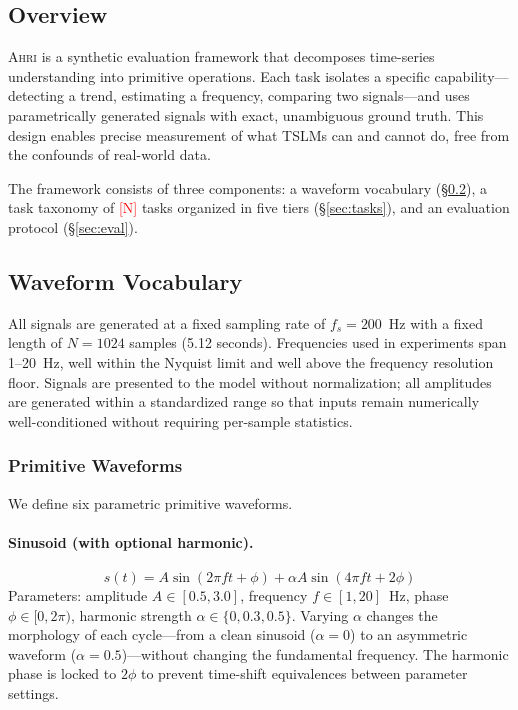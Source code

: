 \documentclass[11pt]{article}
\newcommand{\ahri}{\textsc{Ahri}}
\newcommand{\placeholder}[1]{\textcolor{red}{[#1]}}
\begin{document}
\subsection{Overview}

\ahri{} is a synthetic evaluation framework that decomposes time-series understanding into primitive operations. Each task isolates a specific capability---detecting a trend, estimating a frequency, comparing two signals---and uses parametrically generated signals with exact, unambiguous ground truth. This design enables precise measurement of what TSLMs can and cannot do, free from the confounds of real-world data.

The framework consists of three components: a waveform vocabulary (\S\ref{sec:waveforms}), a task taxonomy of \placeholder{N} tasks organized in five tiers (\S\ref{sec:tasks}), and an evaluation protocol (\S\ref{sec:eval}).

\subsection{Waveform Vocabulary}
\label{sec:waveforms}

All signals are generated at a fixed sampling rate of $f_s = 200$~Hz with a fixed length of $N = 1024$ samples (5.12 seconds). Frequencies used in experiments span 1--20~Hz, well within the Nyquist limit and well above the frequency resolution floor. Signals are presented to the model without normalization; all amplitudes are generated within a standardized range so that inputs remain numerically well-conditioned without requiring per-sample statistics.

\subsubsection{Primitive Waveforms}

We define six parametric primitive waveforms.

\paragraph{Sinusoid (with optional harmonic).}
\begin{equation}
    s(t) = A \sin(2\pi f t + \phi) + \alpha A \sin(4\pi f t + 2\phi)
\end{equation}
Parameters: amplitude $A \in [0.5, 3.0]$, frequency $f \in [1, 20]$~Hz, phase $\phi \in [0, 2\pi)$, harmonic strength $\alpha \in \{0, 0.3, 0.5\}$. Varying $\alpha$ changes the morphology of each cycle---from a clean sinusoid ($\alpha = 0$) to an asymmetric waveform ($\alpha = 0.5$)---without changing the fundamental frequency. The harmonic phase is locked to $2\phi$ to prevent time-shift equivalences between parameter settings.
\end{document}
